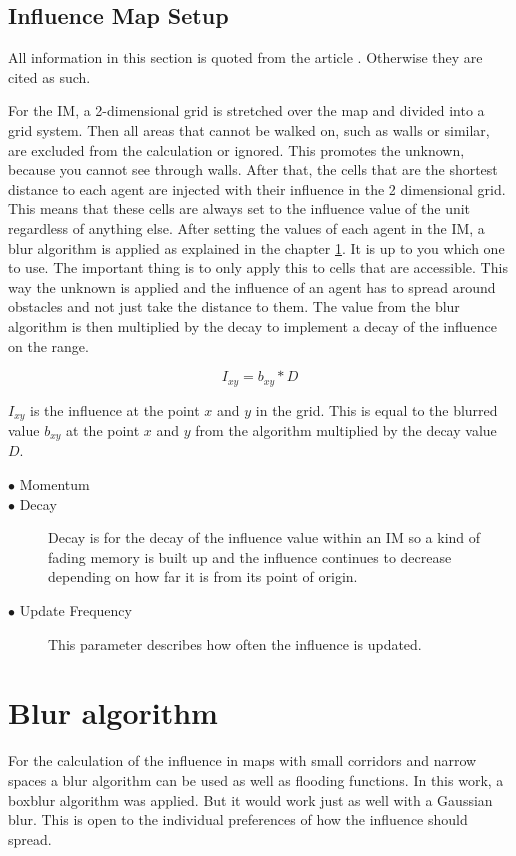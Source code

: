 \documentclass[]{report}
\begin{document}
\subsection{Influence Map Setup}
All information in this section is quoted from the article \citep{gameDevInfluenceMap}. Otherwise they are cited as such.

For the \ac{IM}, a 2-dimensional grid is stretched over the map and divided into a grid system. Then all areas that cannot be walked on, such as walls or similar, are excluded from the calculation or ignored. This promotes the unknown, because you cannot see through walls. After that, the cells that are the shortest distance to each agent are injected with their influence in the 2 dimensional grid. This means that these cells are always set to the influence value of the unit regardless of anything else. After setting the values of each agent in the IM, a blur algorithm is applied as explained in the chapter \ref{ssec:num1}. It is up to you which one to use. The important thing is to only apply this to cells that are accessible. This way the unknown is applied and the influence of an agent has to spread around obstacles and not just take the distance to them. The value from the blur algorithm is then multiplied by the decay to implement a decay of the influence on the range. 

$$I_{xy} = b_{xy} * D$$

$I_{xy}$ is the influence at the point $x$ and $y$ in the grid. This is equal to the blurred value $b_{xy}$ at the point $x$ and $y$ from the algorithm multiplied by the decay value $D$.


\begin{description}
	\item[$\bullet$ Momentum] %
	\item[$\bullet$ Decay] Decay is for the decay of the influence value within an \ac{IM} so a kind of fading memory is built up and the influence continues to decrease depending on how far it is from its point of origin.
	\item[$\bullet$ Update Frequency] This parameter describes how often the influence is updated. 
	\end {description}

\section{Blur algorithm} \label{ssec:num1}
For the calculation of the influence in maps with small corridors and narrow spaces \cite{gameDevInfluenceMap} a blur algorithm can be used as well as flooding functions. In this work, a boxblur algorithm was applied. But it would work just as well with a Gaussian blur. This is open to the individual preferences of how the influence should spread.
\end{document}
